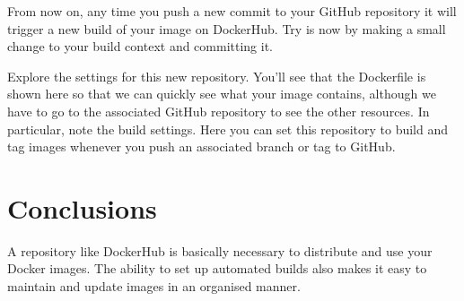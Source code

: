 \documentclass{article}
\begin{document}
From now on, any time you push a new commit to your GitHub repository it will trigger a new build of your image on DockerHub. Try is now by making a small change to your build context and committing it.

Explore the settings for this new repository. You'll see that the Dockerfile is shown here so that we can quickly see what your image contains, although we have to go to the associated GitHub repository to see the other resources. In particular, note the build settings.  Here you can set this repository to build and tag images whenever you push an associated branch or tag to GitHub.

\section{Conclusions}
A repository like DockerHub is basically necessary to distribute and use your Docker images.  The ability to set up automated builds also makes it easy to maintain and update images in an organised manner.
\end{document}
